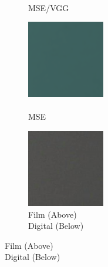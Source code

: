 \begin{figure}
\begin{subfigure}[t]{.24\textwidth}
        \caption{\\MSE/VGG}
      \end{subfigure}
    \hfill
    \begin{subfigure}[t]{.24\textwidth}
        \centering
        \includegraphics[width=\linewidth]{figures/mse-no-noise-no-resize-patch-single.png}
        \caption{\\MSE}
    \end{subfigure}
    \hfill
    \begin{subfigure}[t]{.24\textwidth}
        \centering
        \includegraphics[width=\linewidth]{figures/digital-patch-single.png}
        \captionsetup{justification=centering}
        \caption{Film (Above) \\ Digital (Below)}
      \end{subfigure}
   

\end{figure}
